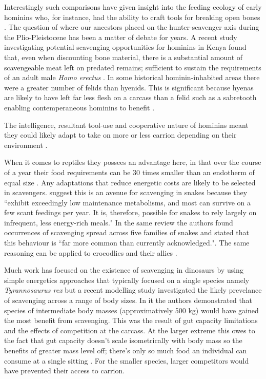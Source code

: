 \documentclass[a4paper,12pt]{article}
\begin{document}
Interestingly such comparisons have given insight into the feeding ecology of early hominins who, for instance, had the ability to craft tools for breaking open bones \citep{ARCM:ARCM12084}.
The question of where our ancestors placed on the hunter-scavenger axis during the Plio-Pleistocene has been a matter of debate for years.
A recent study investigating potential scavenging opportunities for hominins in Kenya found that, even when discounting bone material, there is a substantial amount of scavengeable meat left on predated remains; sufficient to sustain the requirements of an adult male \textit{Homo erectus} \citep{pobiner2015new}.
In some historical hominin-inhabited areas there were a greater number of felids than hyenids.
This is significant because hyenas are likely to have left far less flesh on a carcass than a felid such as a sabretooth enabling contemperaneous hominins to benefit \citep{pobiner2015new}.

The intelligence, resultant tool-use and cooperative nature of hominins meant they could likely adapt to take on more or less carrion depending on their environment \citep{moleon2014humans}.

When it comes to reptiles they possees an advantage here, in that over the course of a year their food requirements can be 30 times smaller than an endotherm of equal size \citep{Nagy1621}.
Any adaptations that reduce energetic costs are likely to be selected in scavengers.
\cite{devault2002scavenging} suggest this is an avenue for scavenging in snakes because they ``exhibit  exceedingly  low  maintenance  metabolisms,  and most  can  survive  on  a  few  scant  feedings per year.
It  is, therefore, possible for snakes to rely largely  on  infrequent,  less  energy-rich  meals." In the same review the authors found occurrences of scavenging spread across five families of snakes and stated that this behaviour is ``far more common than currently acknowledged."\citep{devault2002scavenging}.
The same reasoning can be applied to crocodlies and their allies \citep{forrest2003evidence}.

Much work has focused on the existence of scavenging in dinosaurs by using simple energetics approaches that typically focused on a single species namely \textit{Tyrannosaurus rex} \citep{ruxton2003could,carbone2011intra} but a recent modelling study investigated the likely prevelance of scavenging across a range of body sizes.
In it the authors demonstrated that species of intermediate body masses (approximatively 500 kg) would have gained the most benefit from scavenging.
This was the result of gut capacity limitations and the effects of competition at the carcass.
At the larger extreme this owes to the fact that gut capacity doesn't scale isometrically with body mass so the benefits of greater mass level off; there's only so much food an individual can consume at a single sitting \citep{calder1996size}.
For the smaller species, larger competitors would have prevented their access to carrion.
\end{document}
